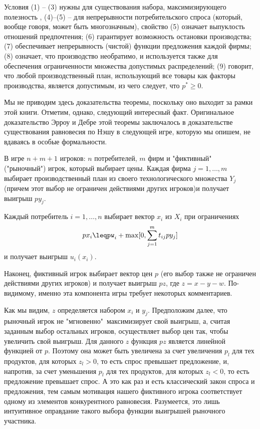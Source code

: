 Условия (1) -- (3) нужны для существования набора,
максимизирующего полезность , (4)--(5) -- для непрерывности
потребительского спроса (который, вообще говоря, может быть
многозначным), свойство (5) означает выпуклость отношений
предпочтения; (6) гарантирует возможность остановки производства;
(7) обеспечивает непрерывность (чистой) функции предложения каждой
фирмы; (8) означает, что производство необратимо, и используется
также для обеспечения ограниченности множества допустимых
распределений; (9) говорит, что любой производственный план,
использующий все товары как факторы производства, является
допустимым, из чего следует, что $p^*\ge 0$.

Мы не приводим здесь доказательства теоремы, поскольку оно выходит
за рамки этой книги. Отметим, однако, следующий интересный факт.
Оригинальное доказательство Эрроу и Дебре этой теоремы заключалось
в доказательстве существования равновесия по Нэшу в следующей
игре, которую мы опишем, не вдаваясь в особые формальности.

В игре $n+m+1$ игроков: $n$ потребителей, $m$ фирм и "фиктивный"\,
("рыночный") игрок, который выбирает цены.
Каждая фирма $j=1,\ldots,m$ выбирает производственный план из своего
технологического множества $Y_j$ (причем этот выбор не ограничен действиями
других игроков)и получает выигрыш $py_j$.

Каждый потребитель $i=1,\ldots,n$  выбирает вектор $x_i$ из $X_i$
при ограничениях
$$px_i\leqpw_i+\max[0,\sum^m_{j=1}t_{ij}py_j]$$
и получает выигрыш $u_i(x_i)$.

Наконец, фиктивный игрок выбирает вектор цен $p$ (его выбор также не
ограничен действиями других игроков) и получает выигрыш $pz$, где
$z=x-y-w$. По-видимому, именно эта компонента игры требует некоторых комментариев.

Как мы видим, $z$ определяется набором $x_i$ и $y_j$. Предположим далее,
что рыночный игрок не  "мгновенно"\, максимизирует свой  выигрыш, а,
считая заданным выбор остальных игроков, осуществляет выбор цен так,
чтобы увеличить свой выигрыш. Для данного $z$ функция $pz$ является линейной
функцией от $p$. Поэтому она может быть увеличена за счет увеличения
$p_l$ для тех продуктов, для которых $z_l>0$, то есть спрос превышает предложение,
и, напротив, за счет уменьшения $p_l$ для тех продуктов, для которых $z_l<0$,
то есть предложение превышает спрос. А это как раз и есть классический
закон спроса и предложения, тем самым мотивация нашего фиктивного игрока
соответствует одному из элементов конкурентного равновесия. Разумеется, это
лишь интуитивное оправдание такого выбора функции выигрышей рыночного
участника.

